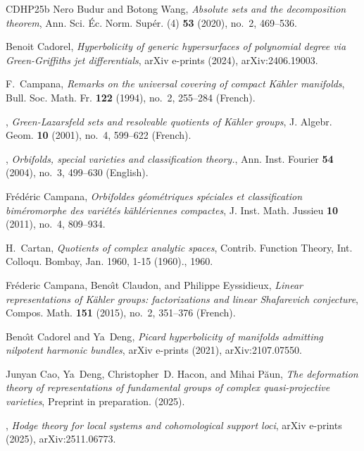 \documentclass[english]{amsproc}
\theoremstyle{plain}
\theoremstyle{definition}
\theoremstyle{remark}
\theoremstyle{plain}
\numberwithin{equation}{thm} %
\begin{document}
\begin{thebibliography}{CDHP25b}
		Nero Budur and Botong Wang, \emph{Absolute sets and the decomposition theorem},
		Ann. Sci. \'Ec. Norm. Sup\'er. (4) \textbf{53} (2020), no.~2, 469--536.
		
		Benoit {Cadorel}, \emph{{Hyperbolicity of generic hypersurfaces of polynomial
				degree via Green-Griffiths jet differentials}}, arXiv e-prints (2024),
		arXiv:2406.19003.
		
		F.~Campana, \emph{Remarks on the universal covering of compact {K{\"a}hler}
			manifolds}, Bull. Soc. Math. Fr. \textbf{122} (1994), no.~2, 255--284
		(French).
		
		\bysame, \emph{Green-{Lazarsfeld} sets and resolvable quotients of {K{\"a}hler}
			groups}, J. Algebr. Geom. \textbf{10} (2001), no.~4, 599--622 (French).
		
		\bysame, \emph{Orbifolds, special varieties and classification theory.}, Ann.
		Inst. Fourier \textbf{54} (2004), no.~3, 499--630 (English).
		
		Fr\'{e}d\'{e}ric Campana, \emph{Orbifoldes g\'{e}om\'{e}triques sp\'{e}ciales
			et classification bim\'{e}romorphe des vari\'{e}t\'{e}s k\"{a}hl\'{e}riennes
			compactes}, J. Inst. Math. Jussieu \textbf{10} (2011), no.~4, 809--934.
		
		H.~Cartan, \emph{Quotients of complex analytic spaces}, Contrib. {Function}
		{Theory}, {Int}. {Colloqu}. {Bombay}, {Jan}. 1960, 1-15 (1960)., 1960.
		
		Fr{\'e}deric Campana, Beno{\^{\i}}t Claudon, and Philippe Eyssidieux,
		\emph{Linear representations of {K{\"a}hler} groups: factorizations and
			linear {Shafarevich} conjecture}, Compos. Math. \textbf{151} (2015), no.~2,
		351--376 (French).
		
		Beno{\^\i}t {Cadorel} and Ya~{Deng}, \emph{{Picard hyperbolicity of manifolds
				admitting nilpotent harmonic bundles}}, arXiv e-prints (2021),
		arXiv:2107.07550.
		
		Junyan {Cao}, Ya~{Deng}, Christopher~D. {Hacon}, and Mihai {P{\u{a}}un},
		\emph{The deformation theory of representations of fundamental groups of
			complex quasi-projective varieties}, Preprint in preparation. (2025).
		
		\bysame, \emph{{Hodge theory for local systems and cohomological support
				loci}}, arXiv e-prints (2025), arXiv:2511.06773.
		

\end{thebibliography}
\end{document}
